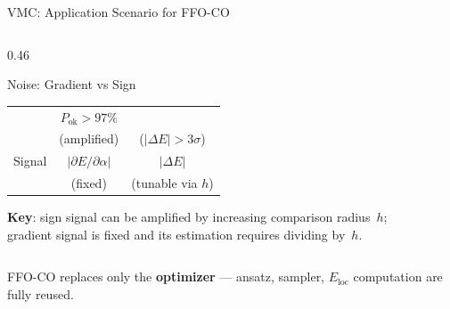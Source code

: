 \documentclass[10pt,aspectratio=169]{beamer}
\begin{document}
\begin{frame}{VMC: Application Scenario for FFO-CO}
\begin{columns}[T]
\begin{column}{0.46\textwidth}
\begin{block}{Noise: Gradient vs Sign}
\begin{tabular}{@{}lcc@{}}
          & $P_{\mathrm{ok}}>97\%$\\
          & (amplified) & ($|\Delta E|>3\sigma$)\\[2pt]
    Signal & $|\partial E/\partial\alpha|$ & $|\Delta E|$ \\
           & (fixed) & (\textcolor{mainblue}{tunable via $h$})\\
  \end{tabular}
  \end{block}
  \vspace{4pt}
  \footnotesize
  \textbf{Key}: sign signal can be amplified by
  increasing comparison radius~$h$;\\
  gradient signal is fixed and its estimation
  requires dividing by~$h$.
\end{column}
\end{columns}

\vspace{4pt}
\begin{block}{}
\centering\small
FFO-CO replaces only the \textbf{optimizer} — ansatz, sampler, $E_{\mathrm{loc}}$ computation are fully reused.
\end{block}
\end{frame}
\end{document}
